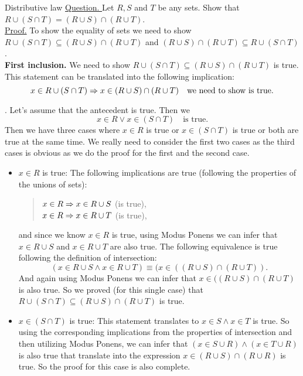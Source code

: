 \begin{example}{Distributive law}
	\underline{Question. }Let $ R,S $ and $ T $ be any sets. Show that $ R \cup (S \cap T) = (R \cup S) \cap (R \cup T) $. \\
	
	\underline{Proof.} To show the equality of sets we need to show $ R \cup (S \cap T) \subseteq (R \cup S) \cap (R \cup T) $ and $ (R \cup S) \cap (R \cup T) \subseteq R \cup (S \cap T) $.\\
	
	\textbf{First inclusion.} We need to show $ R \cup (S \cap T) \subseteq (R \cup S) \cap (R \cup T) $ is true. This statement can be translated into the following implication: 
	\[ x \in R \cup (S \cap T) \Rightarrow x \in (R \cup S) \cap (R \cup T) \quad \text{we need to show is true.}\]
	
	. Let's assume that the antecedent is true. Then we 
	\[ x \in R \vee x \in (S \cap T)  \quad \text{is true.}\]
	Then we have three cases where $ x \in R $ is true or $ x \in (S \cap T) $ is true or both are true at the same time. We really need to consider the first two cases as the third cases is obvious as we do the proof for the first and the second case. 
	\begin{itemize}
		\item $ x \in R  $ is true:
		The following implications are true (following the properties of the unions of sets):
		\begin{quote}
			\centering
			$ x \in R \Rightarrow x \in R \cup S $ (is true),\\
			$ x \in R \Rightarrow x \in R \cup T $ (is true),
		\end{quote}
		and since we know $ x \in R $ is true, using Modus Ponens we can infer that $ x \in R \cup S $ and $ x \in R \cup T $ are also true. The following equivalence is true following the definition of intersection:
		\[   (x \in R \cup S  \wedge  x \in R \cup T) \equiv  (x \in ((R \cup S)  \cap   (R \cup T)).  \]
		And again using Modus Ponens we can infer that $  x \in ((R \cup S)  \cap   (R \cup T) $ is also true.  So we proved (for this single case) that $ R \cup (S \cap T) \subseteq (R \cup S) \cap (R \cup T) $ is true.
		
		\item $ x \in (S \cap T) $ is true:
		This statement translates to $ x \in S \wedge  x \in T $ is true. So using the corresponding implications from the properties of intersection and then utilizing Modus Ponens, we can infer that $ (x \in S \cup R)  \wedge  (x \in T \cup R) $ is also true that translate into the expression $ x \in (R \cup S) \cap (R \cup R) $ is true. So the proof for this case is also complete.
	\end{itemize}



\end{example}
